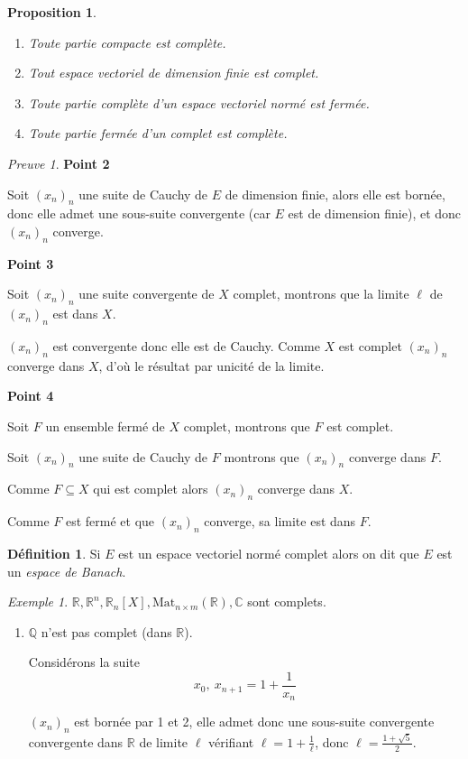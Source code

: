 \documentclass[]{article}
\newtheorem{myproposition}{Proposition}
\theoremstyle{remark}
\newtheorem{myproof}{Preuve}
\newtheorem{myexmpl}{Exemple}
\theoremstyle{definition}
\newtheorem{mydef}{Définition}
\newenvironment{proofpart}[1]{
	\noindent
	{\textbf{\boldmath #1}}
}{
	\checkmark
}
\begin{document}
\begin{myproposition}
	\leavevmode
	\begin{enumerate}
		\item Toute partie compacte est complète.
		\item Tout espace vectoriel de dimension finie est complet.
		\item Toute partie complète d'un espace vectoriel normé est fermée.
		\item Toute partie fermée d'un complet est complète.
	\end{enumerate}
\end{myproposition}

\begin{myproof}
	\begin{proofpart}{Point 2}
		Soit $(x_n)_n$ une suite de Cauchy de $E$ de dimension finie, alors elle est bornée, donc elle admet une sous-suite convergente (car $E$ est de dimension finie), et donc $(x_n)_n$ converge.
	\end{proofpart}
	
	\begin{proofpart}{Point 3}
		Soit $(x_n)_n$ une suite convergente de $X$ complet, montrons que la limite $\ell$ de $(x_n)_n$ est dans $X$.
		
		$(x_n)_n$ est convergente donc elle est de Cauchy. Comme $X$ est complet $(x_n)_n$ converge dans $X$, d'où le résultat par unicité de la limite.
	\end{proofpart}
	
	\begin{proofpart}{Point 4}
		Soit $F$ un ensemble fermé de $X$ complet, montrons que $F$ est complet.
		
		Soit $(x_n)_n$ une suite de Cauchy de $F$ montrons que $(x_n)_n$ converge dans $F$.
		
		Comme $F \subseteq X$ qui est complet alors $(x_n)_n$ converge dans $X$.
		
		Comme $F$ est fermé et que $(x_n)_n$ converge, sa limite est dans $F$.
	\end{proofpart}
\end{myproof}

\begin{mydef}
	Si $E$ est un espace vectoriel normé complet alors on dit que $E$ est un \textit{espace de Banach}.
\end{mydef}

\begin{myexmpl}
	$\mathbb{R}, \mathbb{R}^n, \mathbb{R}_n[X], \text{Mat}_{n \times m}(\mathbb{R}), \mathbb{C}$ sont complets.
	
	\begin{enumerate}
		\item $\mathbb{Q}$ n'est pas complet (dans $\mathbb{R}$).

		Considérons la suite $$x_0, ~ x_{n+1} = 1 + \frac{1}{x_n}$$
		
		$(x_n)_n$ est bornée par 1 et 2, elle admet donc une sous-suite convergente convergente dans $\mathbb{R}$ de limite $\ell$ vérifiant $\ell = 1 + \frac{1}{\ell}$, donc $\ell = \frac{1+\sqrt{5}}{2}$.
	\end{enumerate}
\end{myexmpl}
\end{document}
